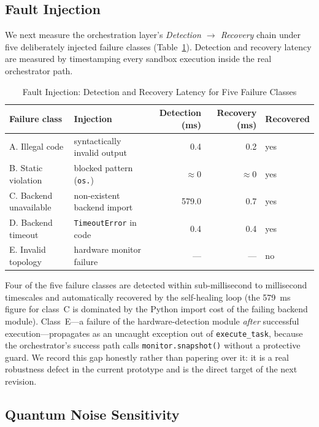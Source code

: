 ﻿\documentclass[12pt,a4paper]{article}
\begin{document}
\subsection{Fault Injection}\label{sec:fault}

We next measure the orchestration layer's \emph{Detection $\rightarrow$ Recovery} chain under five deliberately injected failure classes (Table~\ref{tab:fault}). Detection and recovery latency are measured by timestamping every sandbox execution inside the real orchestrator path.

\begin{table}[H]
\centering
\caption{Fault Injection: Detection and Recovery Latency for Five Failure Classes}
\label{tab:fault}
\small
\begin{tabularx}{\textwidth}{@{}l>{\raggedright\arraybackslash}Xrrl@{}}
\hline
\textbf{Failure class} & \textbf{Injection} & \textbf{Detection (ms)} & \textbf{Recovery (ms)} & \textbf{Recovered} \\
\hline
A. Illegal code & syntactically invalid output & 0.4 & 0.2 & yes \\
B. Static violation & blocked pattern (\texttt{os.}) & $\approx$0 & $\approx$0 & yes \\
C. Backend unavailable & non-existent backend import & 579.0 & 0.7 & yes \\
D. Backend timeout & \texttt{TimeoutError} in code & 0.4 & 0.4 & yes \\
E. Invalid topology & hardware monitor failure & --- & --- & no \\
\hline
\end{tabularx}
\end{table}

Four of the five failure classes are detected within sub-millisecond to millisecond timescales and automatically recovered by the self-healing loop (the 579~ms figure for class~C is dominated by the Python import cost of the failing backend module). Class~E---a failure of the hardware-detection module \emph{after} successful execution---propagates as an uncaught exception out of \texttt{execute\_task}, because the orchestrator's success path calls \texttt{monitor.snapshot()} without a protective guard. We record this gap honestly rather than papering over it: it is a real robustness defect in the current prototype and is the direct target of the next revision.

\subsection{Quantum Noise Sensitivity}\label{sec:noise}
\end{document}
